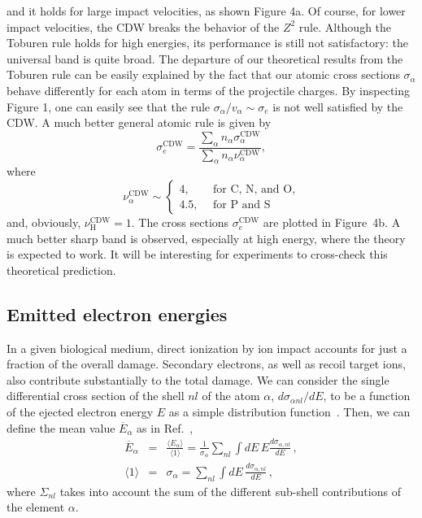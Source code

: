 \documentclass[preprint,12pt]{article}
\begin{document}
and it holds for large impact velocities, as shown Figure 4a.
Of course, for lower impact velocities, the CDW breaks the behavior of 
the $Z^{2}$ rule. Although the Toburen rule holds for high energies, 
its performance is still not satisfactory: the universal band is quite 
broad. The departure of our theoretical 
results from the Toburen rule can be easily explained by the fact that 
our atomic cross sections $\sigma_{\alpha}$ behave differently for 
each atom in terms of the projectile charges. By inspecting Figure 1, 
one can easily see that the rule $\sigma_{\alpha}/v_{\alpha}\sim
\sigma_{e}$ is not well satisfied by the CDW. A much better general 
atomic rule is given by
\begin{equation}
\sigma_{e}^{\text{CDW}}=\frac{\sum\limits_{\alpha}
n_{\alpha}\sigma_{\alpha}^{\text{CDW}}}{\sum\limits_{\alpha}n_{\alpha}
\nu_{\alpha}^{\text{CDW}}},
\label{32} 
\end{equation}
where 
\begin{equation}
\nu_{\alpha }^{\text{CDW}} \sim\left\{ 
\begin{array}{ll}
4,\ \ \  & \text{for C, N, and O,} \\ 
4.5,\ \  & \text{for P and S}
\end{array}
\right. 
\label{35}
\end{equation}
and, obviously, $\nu_{\text{H}}^{\text{CDW}}=1$. The cross sections 
$\sigma_{e}^{\text{CDW}}$ are plotted in Figure~4b. A much better sharp 
band is observed, especially at high energy, where the theory is 
expected to work. It will be interesting for experiments to cross-check 
this theoretical prediction.

\subsection{Emitted electron energies}

In a given biological medium, direct ionization by ion impact accounts 
for just a fraction of the overall damage. Secondary electrons, as well 
as recoil target ions, also contribute substantially to the total damage. 
We can consider the single differential cross section of the shell 
$nl$ of the atom $\alpha$, $d\sigma _{\alpha nl}/dE$, to be a function 
of the ejected electron energy $E$ as a simple distribution 
function~\cite{surdutovic2018}. Then, we can define the mean value 
$\overline{E}_{\alpha}$ as in Ref.~\cite{abril2015},
\begin{eqnarray}
\overline{E}_{\alpha} &=&\frac{\langle E_{\alpha}\rangle}{\langle
1\rangle}=\frac{1}{\sigma_{\alpha}}\sum\limits_{nl}\int dE\,E
\frac{d\sigma_{\alpha,nl}}{dE}\,,  
\label{40} \\
\langle 1\rangle &=&\sigma_{\alpha}=\sum\limits_{nl}\int dE\,
\frac{d\sigma_{\alpha,nl}}{dE}\,,  
\label{50}
\end{eqnarray}
where $\Sigma_{nl}$ takes into account the sum of the different 
sub-shell contributions of the element $\alpha$.
\end{document}
